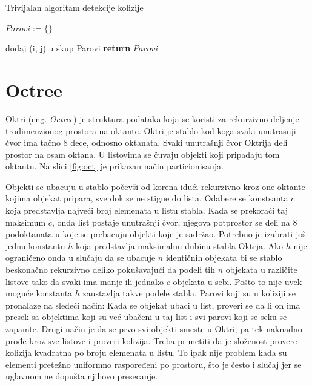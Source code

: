 \documentclass[12pt,oneside]{memoir}
\begin{document}
\begin{algorithm}
	\caption{Trivijalan algoritam detekcije kolizije}
    \label{alg:triv}
	\begin{algorithmic}[1]
		\State $Parovi := \{ \}$

				\State dodaj (i, j) u skup Parovi
			\EndIf		
		\EndFor
		\EndFor
		\State \textbf{return} $Parovi$
		\EndProcedure
    \end{algorithmic}
\end{algorithm}

\section{Octree}
\label{subsec:octree}

Oktri (eng. {\em Octree}) je struktura podataka koja se koristi za rekurzivno deljenje trodimenzionog
prostora na oktante. Oktri je stablo kod koga svaki unutrasnji čvor ima tačno 8 dece, odnosno oktanata. 
Svaki unutrašnji čvor Oktrija deli prostor na osam oktana.
U listovima se čuvaju objekti koji pripadaju tom oktantu.
Na slici \ref{fig:oct} je prikazan način particionisanja.

Objekti se ubacuju u stablo počevši od korena idući rekurzivno kroz one oktante kojima objekat pripara,
sve dok se ne stigne do lista.
Odabere se konstsanta $c$ koja predstavlja najveći broj elemenata u listu stabla. 
Kada se prekorači taj maksimum $c$, onda list postaje unutrašnji čvor, njegova potprostor se deli 
na 8 podoktanata u koje se prebacuju objekti koje je sadržao.
Potrebno je izabrati još jednu konstantu $h$ koja predstavlja maksimalnu dubinu stabla Oktrja.
Ako $h$ nije ograničeno onda u slučaju da se ubacuje $n$ identičnih objekata bi se stablo 
beskonačno rekurzivno deliko pokušavajući da podeli tih $n$ objekata u različite listove 
tako da svaki ima manje ili jednako $c$ objekata u sebi. 
Pošto to nije uvek moguće konstanta $h$ zaustavlja takve podele stabla.
Parovi koji su u koliziji se pronalaze na sledeći način:
Kada se objekat ubaci u list, proveri se da li on ima presek sa objektima koji su već
ubačeni u taj list i svi parovi koji se seku se zapamte.
Drugi način je da se prvo svi objekti smeste u Oktri, pa tek naknadno prođe kroz sve listove 
i proveri kolizija. 
Treba primetiti da je složenost provere kolizija kvadratna po broju elemenata u listu.
To ipak nije problem kada su elementi pretežno uniformno raspoređeni po prostoru, što je često 
i slučaj jer se uglavnom ne dopušta njihovo presecanje. 
\end{document}
